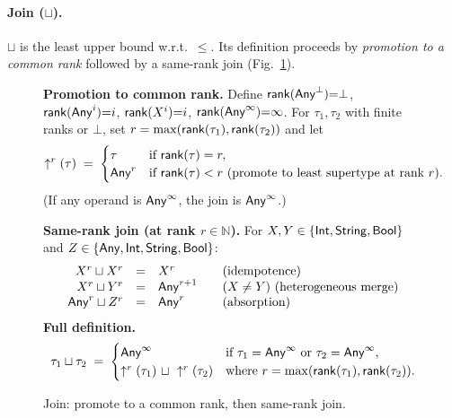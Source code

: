 \paragraph{Join (\texorpdfstring{$\sqcup$}{sqcup}).}
$\sqcup$ is the least upper bound w.r.t.\ $\le$.
Its definition proceeds by \emph{promotion to a common rank} followed by a same-rank join (Fig.~\ref{fig:join}).

\begin{figure}[t]
\centering
\textbf{Promotion to common rank.}
Define $\mathsf{rank}(\mathsf{Any}^{\bot}){=}\bot$, $\mathsf{rank}(\mathsf{Any}^{i}){=}i$, $\mathsf{rank}(X^{i}){=}i$, $\mathsf{rank}(\mathsf{Any}^{\infty}){=}\infty$.
For $\tau_1,\tau_2$ with finite ranks or $\bot$, set $r=\max(\mathsf{rank}(\tau_1),\mathsf{rank}(\tau_2))$ and let
\[
\uparrow^{r}(\tau) \;=\;
\begin{cases}
\tau & \text{if } \mathsf{rank}(\tau)=r,\\
\mathsf{Any}^{r} & \text{if } \mathsf{rank}(\tau)<r\text{ (promote to least supertype at rank $r$).}
\end{cases}
\]
(If any operand is $\mathsf{Any}^{\infty}$, the join is $\mathsf{Any}^{\infty}$.)

\medskip
\textbf{Same-rank join (at rank $r\in\mathbb{N}$).}
For $X,Y\in\{\mathsf{Int},\mathsf{String},\mathsf{Bool}\}$ and $Z\in\{\mathsf{Any},\mathsf{Int},\mathsf{String},\mathsf{Bool}\}$:
\[
\begin{array}{r@{\quad=\quad}l@{\qquad}l}
X^{r} \sqcup X^{r} & X^{r} & \text{(idempotence)}\\
X^{r} \sqcup Y^{r} & \Any^{r+1} & (X\neq Y)\ \text{(heterogeneous merge)}\\
\Any^{r} \sqcup Z^{r} & \Any^{r} & \text{(absorption)}\\
\end{array}
\]
\medskip
\textbf{Full definition.}
\[
\tau_1 \sqcup \tau_2 \;=\;
\begin{cases}
\mathsf{Any}^{\infty} & \text{if }\tau_1=\mathsf{Any}^{\infty}\text{ or }\tau_2=\mathsf{Any}^{\infty},\\
\uparrow^{r}(\tau_1)\ \sqcup\ \uparrow^{r}(\tau_2) & \text{where } r=\max(\mathsf{rank}(\tau_1),\mathsf{rank}(\tau_2)).
\end{cases}
\]
\vspace{-1mm}
\caption{Join: promote to a common rank, then same-rank join.}
\label{fig:join}
\end{figure}

